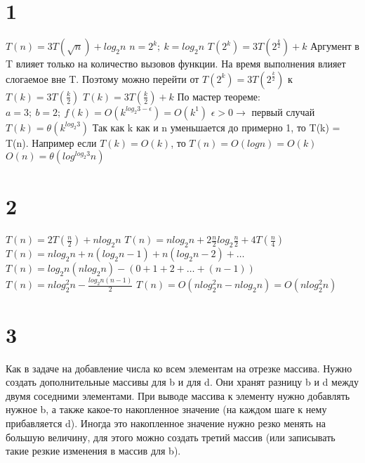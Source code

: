 \documentclass[12pt]{extarticle}
\begin{document}
\section*{1}
$T(n) = 3T(\sqrt{n}) + log_2 n$ \newline
$n = 2^k;\ k = log_2 n$ \newline
$T(2^k) = 3T(2^{\frac{k}{2}}) + k$ \newline
Аргумент в T влияет только на количество вызовов функции. На время выполнения влияет слогаемое вне T. Поэтому можно перейти от $T(2^k) = 3T(2^{\frac{k}{2}})$ к $T(k) = 3T(\frac{k}{2})$ \newline
$T(k) = 3T(\frac{k}{2}) + k$ \newline
По мастер теореме: \newline
$a = 3;\ b = 2;\ f(k) = O(k^{log_2 3 - \epsilon}) = O(k^1)$ \newline
$\epsilon > 0 \rightarrow$ первый случай \newline
$T(k) = \theta(k^{log_2 3})$ \newline
Так как k как и n уменьшается до примерно 1, то T(k) = T(n). Например если $T(k) = O(k)$, то $T(n) = O(logn) = O(k)$\newline
$O(n) = \theta(log^{log_2 3}n)$

\section*{2}
$T(n) = 2T(\frac{n}{2}) + nlog_2 n$ \newline
$T(n) = nlog_2 n + 2\frac{n}{2}log_2 \frac{n}{2} + 4T(\frac{n}{4})$\newline
$T(n) = nlog_2 n + n(log_2 n - 1) + n(log_2 n - 2) + \dots$\newline
$T(n) = log_2 n (nlog_2 n) - (0 + 1 + 2 + \dots + (n-1))$\newline
$T(n) = n log_2^2 n - \frac{log_2 n (n-1)}{2}$\newline
$T(n) = O(nlog_2^2 n - nlog_2 n) = O(nlog_2^2 n)$

\section*{3}
Как в задаче на добавление числа ко всем элементам на отрезке массива.\newline
Нужно создать дополнительные массивы для b и для d. Они хранят разницу b и d между двумя соседними элементами. При выводе массива к элементу нужно добавлять нужное b, а также какое-то накопленное значение (на каждом шаге к нему прибавляется d). Иногда это накопленное значение нужно резко менять на большую величину, для этого можно создать третий массив (или записывать такие резкие изменения в массив для b).
\end{document}
